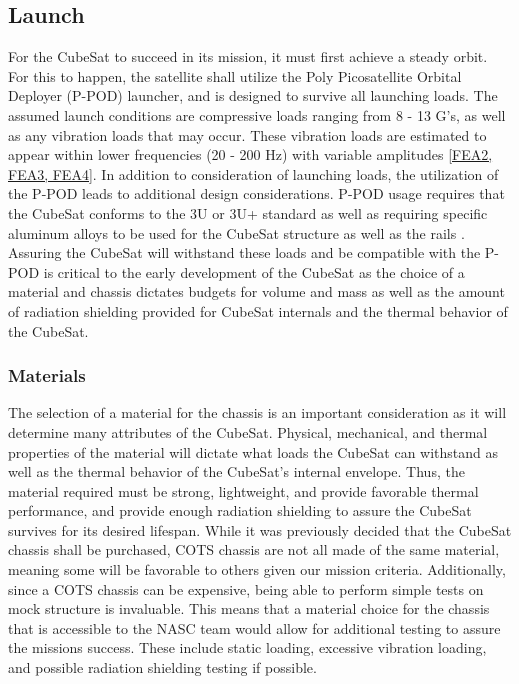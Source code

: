 
\subsection{Launch}
For the CubeSat to succeed in its mission, it must first achieve a steady orbit. For this to happen, the satellite shall utilize the Poly Picosatellite Orbital Deployer (P-POD) launcher, and is designed to survive all launching loads. The assumed launch conditions are compressive loads ranging from 8 - 13 G's, as well as any vibration loads that may occur. These vibration loads are estimated to appear within lower frequencies (20 - 200 Hz) with variable amplitudes \ref{FEA2, FEA3, FEA4}. In addition to consideration of launching loads, the utilization of the P-POD leads to additional design considerations. P-POD usage requires that the CubeSat conforms to the 3U or 3U+ standard as well as requiring specific aluminum alloys to be used for the 
CubeSat structure as well as the rails \cite{CSS}. Assuring the CubeSat will withstand these loads and be compatible with the P-POD is critical to the early development of the CubeSat as the choice of a material and chassis dictates budgets for volume and mass as well as the amount of radiation shielding provided for CubeSat internals and the thermal behavior of the CubeSat.
\subsubsection{Materials}
The selection of a material for the chassis is an important consideration as it will determine many attributes of the CubeSat. Physical, mechanical, and thermal  properties of the material will dictate what loads the CubeSat can withstand as well as the thermal behavior of the CubeSat's internal envelope. Thus, the material required must be strong, lightweight, and provide favorable thermal performance, and provide enough radiation shielding to assure the CubeSat survives for its desired lifespan. While it was previously decided that the CubeSat chassis shall be purchased, COTS chassis are not all made of the same material, meaning some will be favorable to others given our mission criteria. Additionally, since a COTS chassis can be expensive, being able to perform simple tests on mock structure is invaluable. This means that a material choice for the chassis that is accessible to the NASC team would allow for additional testing to assure the missions success. These include static loading, excessive vibration loading, and possible radiation shielding testing if possible.
